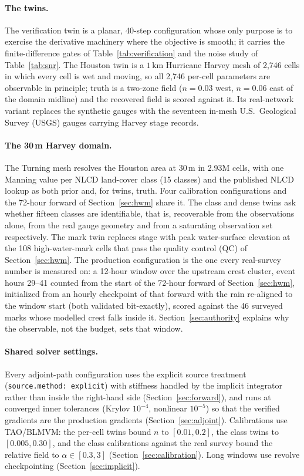 \documentclass[11pt]{article}
\begin{document}
\paragraph{The twins.}
The verification twin is a planar, 40-step configuration whose only
purpose is to exercise the derivative machinery where the objective is
smooth; it carries the finite-difference gates of
Table~\ref{tab:verification} and the noise study of
Table~\ref{tab:snr}. The Houston twin is a $1$\,km Hurricane Harvey
mesh of 2{,}746 cells in which every cell is wet and moving, so all
2{,}746 per-cell parameters are observable in principle; truth is a
two-zone field ($n = 0.03$ west, $n = 0.06$ east of the domain
midline) and the recovered field is scored against it. Its real-network
variant replaces the synthetic gauges with the seventeen in-mesh
U.S.\ Geological Survey (USGS) gauges carrying Harvey stage records.

\paragraph{The 30\,m Harvey domain.}
The Turning mesh resolves the Houston area at $30$\,m in 2.93M cells,
with one Manning value per NLCD land-cover class (15 classes) and the
published NLCD lookup as both prior and, for twins, truth. Four
calibration configurations and the 72-hour forward of
Section~\ref{sec:hwm} share it. The class and dense twins ask whether fifteen
classes are identifiable, that is, recoverable from the observations
alone, from the real gauge geometry and from a saturating observation
set respectively. The mark twin replaces stage
with peak water-surface elevation at the 108 high-water-mark cells that
pass the quality control (QC) of Section~\ref{sec:hwm}. The production
configuration is the one every real-survey number is measured on: a
12-hour window over the upstream crest cluster, event hours 29--41
counted from the start of the 72-hour forward of
Section~\ref{sec:hwm}, initialized from an hourly checkpoint of that
forward with the rain re-aligned to the window start (both validated
bit-exactly), scored against the 46 surveyed marks whose modelled crest
falls inside it. Section~\ref{sec:authority} explains why the observable,
not the budget, sets that window.

\paragraph{Shared solver settings.}
Every adjoint-path configuration uses the explicit source treatment
(\texttt{source.method: explicit}) with stiffness handled by the
implicit integrator rather than inside the right-hand side
(Section~\ref{sec:forward}), and runs at converged inner tolerances
(Krylov $10^{-4}$, nonlinear $10^{-5}$) so that the verified gradients
are the production gradients (Section~\ref{sec:adjoint}). Calibrations
use TAO/BLMVM: the per-cell twins bound $n$ to $[0.01, 0.2]$, the class
twins to $[0.005, 0.30]$, and the class calibrations against the real
survey bound the relative field to $\alpha \in [0.3, 3]$
(Section~\ref{sec:calibration}). Long windows use revolve
checkpointing (Section~\ref{sec:implicit}).
\end{document}
